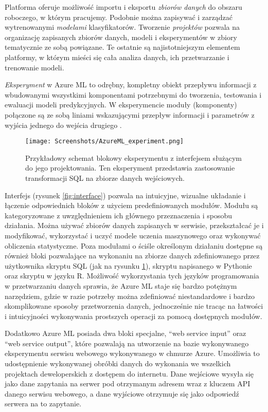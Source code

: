 Platforma oferuje możliwość importu i eksportu \emph{zbiorów danych} do obszaru roboczego, w którym pracujemy.
Podobnie można zapisywać i zarządzać wytrenowanymi \emph{modelami} klasyfikatorów.
Tworzenie \emph{projektów} pozwala na organizację zapisanych zbiorów danych, modeli i eksperymentów w zbiory tematycznie ze sobą powiązane.
Te ostatnie są najistotniejszym elementem platformy, w którym mieści się cała analiza danych, ich przetwarzanie i trenowanie modeli.

\emph{Eksperyment} w Azure ML to odrębny, kompletny obiekt przepływu informacji z wbudowanymi wszystkimi komponentami potrzebnymi do tworzenia, testowania i ewaluacji modeli predykcyjnych.
W eksperymencie moduły (komponenty) połączone są ze sobą liniami wskazującymi przepływ informacji i parametrów z wyjścia jednego do wejścia drugiego \cite{barga2015introducing}.

\begin{figure}[ht]
	\texttt{[image: Screenshots/AzureML\_experiment.png]}
	\caption{Przykładowy schemat blokowy eksperymentu z interfejsem służącym do jego projektowania. Ten eksperyment przedstawia zastosowanie transformacji SQL na zbiorze danych wejściowych.}
	\label{fig:experiment}
\end{figure}

Interfejs (rysunek \ref{fig:interface}) pozwala na intuicyjne, wizualne układanie i łączenie odpowiednich bloków z użyciem predefiniowanych modułów.
Modułu są kategoryzowane z uwzględnieniem ich głównego przeznaczenia i sposobu działania.
Można używać zbiorów danych zapisanych w serwisie, przekształcać je i modyfikować, wykorzystać i uczyć modele uczenia maszynowego oraz wykonywać obliczenia statystyczne.
Poza modułami o ściśle określonym działaniu dostępne są również bloki pozwalające na wykonaniu na zbiorze danych zdefiniowanego przez użytkownika skryptu SQL (jak na rysunku \ref{fig:experiment}), skryptu napisanego w Pythonie oraz skryptu w języku R.
Możliwość wykorzystania tych języków programowania w przetwarzaniu danych sprawia, że Azure ML staje się bardzo potężnym narzędziem, gdzie w razie potrzeby można zdefiniować niestandardowe i bardzo skomplikowane sposoby przetworzenia danych, jednocześnie nie tracąc na łatwości i intuicyjności wykonywania prostszych operacji za pomocą dostępnych modułów.

Dodatkowo Azure ML posiada dwa bloki specjalne, ``web service input'' oraz ``web service output'', które pozwalają na utworzenie na bazie wykonywanego eksperymentu serwisu webowego wykonywanego w chmurze Azure.
Umożliwia to udostępnienie wykonywanej obróbki danych do wykonania we wszelkich projektach deweloperskich z dostępem do internetu.
Dane wejściowe wysyła się jako dane zapytania na serwer pod otrzymanym adresem wraz z kluczem API danego serwisu webowego, a dane wyjściowe otrzymuje się jako odpowiedź serwera na to zapytanie.
